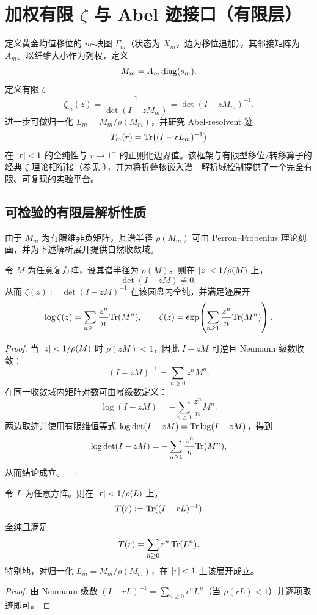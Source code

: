 
\section{加权有限 \texorpdfstring{$\zeta$}{zeta} 与 Abel 迹接口（有限层）}

定义黄金均值移位的 $m$-块图 $\Gamma_m$（状态为 $X_m$，边为移位追加），其邻接矩阵为 $A_m$。以纤维大小作为列权，定义
$$
M_m=A_m\,\mathrm{diag}(s_m).
$$
定义有限 $\zeta$
$$
\zeta_m(z)=\frac{1}{\det(I-zM_m)}=\det(I-zM_m)^{-1}.
$$
进一步可做归一化 $L_m=M_m/\rho(M_m)$，并研究 Abel-resolvent 迹
$$
T_m(r)=\mathrm{Tr}\big((I-rL_m)^{-1}\big)
$$
在 $\left\lvert r\right\rvert<1$ 的全纯性与 $r\to 1^{-}$ 的正则化边界值。该框架与有限型移位/转移算子的经典 $\zeta$ 理论相衔接（参见 \cite{lind1995symbolic,bowenlanford1970zeta}），并为将折叠核嵌入谱—解析域控制提供了一个完全有限、可复现的实验平台。

\subsection{可检验的有限层解析性质}

由于 $M_m$ 为有限维非负矩阵，其谱半径 $\rho(M_m)$ 可由 Perron--Frobenius 理论刻画，并为下述解析展开提供自然收敛域。

\begin{proposition}\label{prop:zeta-analytic}
令 $M$ 为任意复方阵，设其谱半径为 $\rho(M)$。则在 $\left\lvert z\right\rvert<1/\rho(M)$ 上，
$$
\det(I-zM)\ne 0,
$$
从而 $\zeta(z):=\det(I-zM)^{-1}$ 在该圆盘内全纯，并满足迹展开
$$
\log \zeta(z)=\sum_{n\ge 1}\frac{z^n}{n}\mathrm{Tr}(M^n),\qquad
\zeta(z)=\exp\!\left(\sum_{n\ge 1}\frac{z^n}{n}\mathrm{Tr}(M^n)\right).
$$
\end{proposition}

\begin{proof}
当 $\left\lvert z\right\rvert<1/\rho(M)$ 时 $\rho(zM)<1$，因此 $I-zM$ 可逆且 Neumann 级数收敛：
$$
(I-zM)^{-1}=\sum_{n\ge 0} z^n M^n.
$$
在同一收敛域内矩阵对数可由幂级数定义：
$$
\log(I-zM)=-\sum_{n\ge 1}\frac{z^n}{n}M^n.
$$
两边取迹并使用有限维恒等式 $\log\det(I-zM)=\mathrm{Tr}\log(I-zM)$，得到
$$
\log\det(I-zM)=-\sum_{n\ge 1}\frac{z^n}{n}\mathrm{Tr}(M^n),
$$
从而结论成立。
\end{proof}

\begin{proposition}\label{prop:abel-trace}
令 $L$ 为任意方阵。则在 $\left\lvert r\right\rvert<1/\rho(L)$ 上，
$$
T(r):=\mathrm{Tr}((I-rL)^{-1})
$$
全纯且满足
$$
T(r)=\sum_{n\ge 0} r^n\,\mathrm{Tr}(L^n).
$$
特别地，对归一化 $L_m=M_m/\rho(M_m)$，在 $\left\lvert r\right\rvert<1$ 上该展开成立。
\end{proposition}

\begin{proof}
由 Neumann 级数 $(I-rL)^{-1}=\sum_{n\ge 0} r^nL^n$（当 $\rho(rL)<1$）并逐项取迹即可。
\end{proof}

